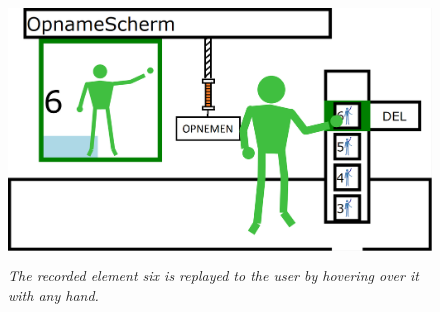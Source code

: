 \begin{figure}[H]
	\begin{center}
		\includegraphics[width=12.5cm, height=7cm]{figures/11_replay_recording.png}
		\caption{\emph{The recorded element six is replayed to the user by hovering over it with any hand.}}
		\label{replay of element six}
	\end{center}
\end{figure}

